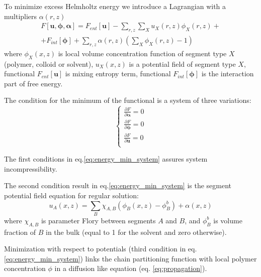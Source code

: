 \documentclass[12pt, a4paper]{article}
\begin{document}
To minimize excess Helmholtz energy we introduce a Lagrangian with a multipliers $\alpha(r,z)$
\begin{equation}
    \label{eq:fe_lagrangian}
    \begin{split}
    F[\mathbf{u}, \boldsymbol{\phi}, \boldsymbol{\alpha}] = F_{ent}[\mathbf{u}] - \sum\limits_{r,z} \sum\limits_X u_X(r, z) \phi_X(r, z) + \\
    + F_{int} [\boldsymbol{\phi}] 
    + \sum\limits_{r,z} \alpha(r, z) \left( \sum\limits_X \phi_X(r, z) - 1 \right)
    \end{split} 
\end{equation}
where $\phi_X(x, z)$ is local volume concentration function of segment type $X$ (polymer, colloid or solvent), $u_X(x, z)$ is a potential field of segment type $X$, functional $F_{ent}[\mathbf{u}]$ is mixing entropy term, functional $F_{int} [\boldsymbol{\phi}]$ is the interaction part of free energy. 

The condition for the minimum of the functional is a system of three variations:
\begin{equation}
    \label{eq:energy_min_system}
    \begin{cases}
    \frac{\partial F}{\partial \boldsymbol{\alpha}} = 0 \\
    \frac{\partial F}{\partial \boldsymbol{\phi}} = 0 \\
        \frac{\partial F}{\partial \mathbf{u}} = 0 \\
    \end{cases}
\end{equation}

The first conditions in eq.\ref{eq:energy_min_system} assures system incompressibility.

The second condition result in eq.\ref{eq:energy_min_system} is the segment potential field equation for regular solution:
\begin{equation}
    \label{eq:u-phi}
    u_A(x, z) =\sum\limits_{B} \chi_{A,B} \left(\phi_B(x,z) - \phi_B^b \right) + \alpha(x, z)
\end{equation}
where $\chi_{A,B}$ is parameter Flory between segments $A$ and $B$, and $\phi_B^b$ is volume fraction of $B$ in the bulk (equal to 1 for the solvent and zero otherwise).

Minimization with respect to potentials (third condition in eq.\ref{eq:energy_min_system}) links the chain partitioning function with local polymer concentration $\phi$ in a diffusion like equation (eq. \ref{eq:propagation}).
\end{document}

